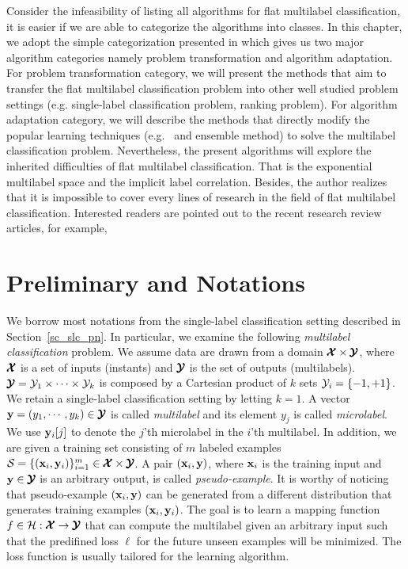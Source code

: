 {Consider the infeasibility of listing all algorithms for flat multilabel classification, it is easier if we are able to categorize the algorithms into classes.
In this chapter, we adopt the simple categorization presented in \citep{Tsoumakas07multi,Tsoumakas10mining} which gives us two major algorithm categories namely problem transformation and algorithm adaptation.
For problem transformation category, we will present the methods that aim to transfer the flat multilabel classification problem into other well studied problem settings (e.g. single-label classification problem, ranking problem).
For algorithm adaptation category, we will describe the methods that directly modify the popular learning techniques (e.g. \lr\ and ensemble method) to solve the multilabel classification problem.
Nevertheless, the present algorithms will explore the inherited difficulties of flat multilabel classification.
That is the exponential multilabel space and the implicit label correlation.
Besides, the author realizes that it is impossible to cover every lines of research in the field of flat multilabel classification.
Interested readers are pointed out to the recent research review articles, for example, \citep{Tsoumakas07multi,Tsoumakas10mining,Zhang14a}



\section{Preliminary and Notations} \label{sc_mlc_pn}

We borrow most notations from the single-label classification setting described in Section~\ref{sc_slc_pn}.
In particular, we examine the following \textit{multilabel classification} problem.
We assume data are drawn from a domain $\pmb {\mathcal{X}}\times\pmb {\mathcal{Y}}$, where $\pmb {\mathcal{X}}$ is a set of inputs (instants) and $\pmb {\mathcal{Y}}$ is the set of outputs (multilabels).
$\pmb {\mathcal{Y}} = \mathcal{Y}_1\times\cdots\times\mathcal{Y}_k$ is composed by a Cartesian product of $k$ sets $\mathcal{Y}_i=\{-1,+1\}$.
We retain a single-label classification setting by letting $k=1$.
A vector $\mathbf {y}=(y_1,\cdots,y_k)\in\pmb {\mathcal{Y}}$ is called \textit{multilabel} and its element $y_j$ is called \textit{microlabel}.
We use $\mathbf {y}_i[j]$ to denote the $j$'th microlabel in the $i$'th multilabel.
In addition, we are given a training set consisting of $m$ labeled examples $\mathcal{S}=\{(\mathbf {x}_i,\mathbf {y}_i)\}_{i=1}^{m}\in\pmb {\mathcal{X}}\times\pmb {\mathcal{Y}}$. 
A pair $(\mathbf {x}_i,\mathbf {y})$, where $\mathbf {x}_i$ is the training input and $\mathbf {y}\in\pmb {\mathcal{Y}}$ is an arbitrary output, is called \textit{pseudo-example}.
It is worthy of noticing that pseudo-example $(\mathbf {x}_i,\mathbf {y})$ can be generated from a different distribution that generates training examples $(\mathbf {x}_i,\mathbf {y}_i)$.
The goal is to learn a mapping function $f\in\mathcal{H}:\pmb {\mathcal{X}}\rightarrow\pmb {\mathcal{Y}}$ that can compute the multilabel given an arbitrary input such that the predifined loss $\ell$ for the future unseen examples will be minimized.
The loss function is usually tailored for the learning algorithm.



}
